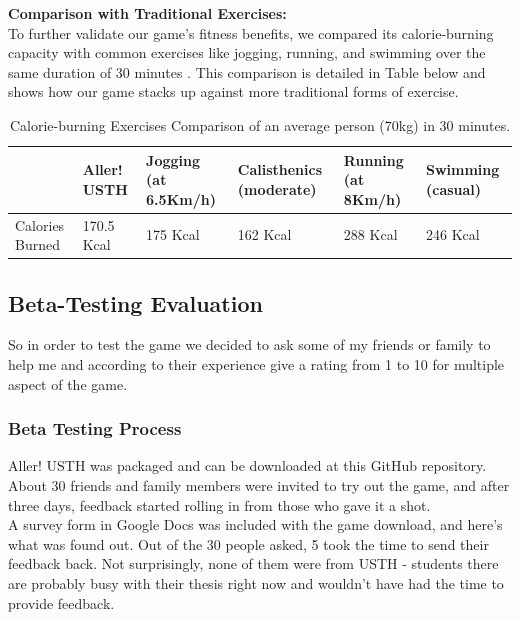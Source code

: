 \documentclass[12pt]{article}
\begin{document}
\textbf{Comparison with Traditional Exercises:}\\
To further validate our game's fitness benefits, we compared its calorie-burning capacity with common exercises like jogging, running, and swimming over the same duration of 30 minutes \cite{vinmec2019} \cite{harvard2004}. This comparison is detailed in Table below and shows how our game stacks up against more traditional forms of exercise.\\

\begin{table}[h]
    \centering
    \caption{Calorie-burning Exercises Comparison of an average person (70kg) in 30 minutes.}
    \begin{tabularx}{\textwidth}{|Y|Y|Y|Y|Y|Y|}
        \hline
        & Aller! USTH & Jogging (at 6.5Km/h) & Calisthenics (moderate) & Running (at 8Km/h) & Swimming (casual) \\
        \hline
        Calories Burned & 170.5 Kcal & 175 Kcal & 162 Kcal & 288 Kcal & 246 Kcal \\
        \hline
    \end{tabularx}
\end{table}
\clearpage

\subsection{Beta-Testing Evaluation}
So in order to test the game we decided to ask some of my friends or family to help me and according to their experience give a rating from 1 to 10 for multiple aspect of the game.

\subsubsection{Beta Testing Process}
\hspace*{1.5em}Aller! USTH was packaged and can be downloaded at this GitHub repository. 
About 30 friends and family members were invited to try out the game, and after three days, feedback started rolling in from those who gave it a shot.\\

A survey form in Google Docs was included with the game download, and here's what was found out. Out of the 30 people asked, 5 took the time to send their feedback back. 
Not surprisingly, none of them were from USTH - students there are probably busy with their thesis right now and wouldn't have had the time to provide feedback.\\
\end{document}
